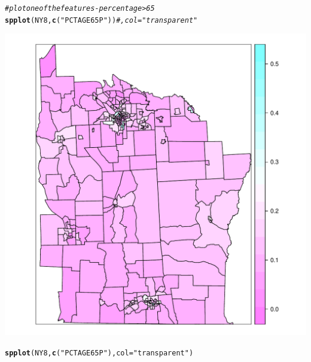 \documentclass{article}\usepackage[]{graphicx}\usepackage[]{color}
\makeatletter
\def\maxwidth{ %
  \ifdim\Gin@nat@width>\linewidth
    \linewidth
  \else
    \Gin@nat@width
  \fi
}
\newcommand{\hlstr}[1]{\textcolor[rgb]{0.192,0.494,0.8}{#1}}%
\newcommand{\hlcom}[1]{\textcolor[rgb]{0.678,0.584,0.686}{\textit{#1}}}%
\newcommand{\hlstd}[1]{\textcolor[rgb]{0.345,0.345,0.345}{#1}}%
\newcommand{\hlkwc}[1]{\textcolor[rgb]{0.333,0.667,0.333}{#1}}%
\newcommand{\hlkwd}[1]{\textcolor[rgb]{0.737,0.353,0.396}{\textbf{#1}}}%
\newenvironment{kframe}{%
 \def\at@end@of@kframe{}%
 \ifinner\ifhmode%
  \def\at@end@of@kframe{\end{minipage}}%
  \begin{minipage}{\columnwidth}%
 \fi\fi%
 \def\FrameCommand##1{\hskip\@totalleftmargin \hskip-\fboxsep
 \colorbox{shadecolor}{##1}\hskip-\fboxsep
     \hskip-\linewidth \hskip-\@totalleftmargin \hskip\columnwidth}%
 \MakeFramed {\advance\hsize-\width
   \@totalleftmargin\z@ \linewidth\hsize
   \@setminipage}}%
 {\par\unskip\endMakeFramed%
 \at@end@of@kframe}
\newenvironment{knitrout}{}{} %
\makeatother
\begin{document}
\begin{knitrout}
\color{fgcolor}\begin{kframe}
\begin{alltt}
\hlcom{#plot one of the features - percent age > 65}
\hlkwd{spplot}\hlstd{(NY8,} \hlkwd{c}\hlstd{(}\hlstr{"PCTAGE65P"}\hlstd{))}\hlcom{#, col="transparent"}
\end{alltt}
\end{kframe}
\includegraphics[width=\maxwidth]{figure/unnamed-chunk-111} 
\begin{kframe}\begin{alltt}
\hlkwd{spplot}\hlstd{(NY8,} \hlkwd{c}\hlstd{(}\hlstr{"PCTAGE65P"}\hlstd{),} \hlkwc{col}\hlstd{=}\hlstr{"transparent"}\hlstd{)}
\end{alltt}
\end{kframe}

\end{knitrout}
\end{document}
